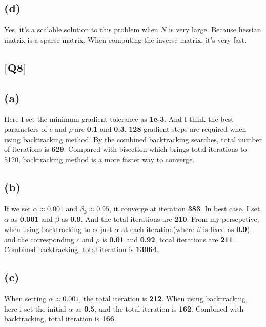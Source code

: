 \documentclass[12pt, a4 paper]{article}
\begin{document}
\begin{framed}
        \subsection{(d)}
        Yes, it's a scalable solution to this problem when $N$ is very large. Because hessian matrix is a sparse matrix. When computing the inverse matrix, it's very fast.
    \end{framed}

    \begin{framed}
        \section{[Q8]}
        \subsection{(a)}
        Here I set the minimum gradient tolerance as \textbf{1e-3}. And I think the best parameters
         of $c$ and $\rho$ are \textbf{0.1} and \textbf{0.3}. \textbf{128} 
         gradient steps are required when using backtracking method. By the combined
          backtracking searches, total number of iterations is \textbf{629}. Compared 
          with bisection which brings total iterations to 5120, backtracking 
          method is a more faster way to converge.

        \subsection{(b)}
        If we set $\alpha \approx 0.001$ and $\beta_{k} \approx 0.95$, it converge at iteration
        \textbf{383}. In best case, I set $\alpha$ as \textbf{0.001} and $\beta$ as \textbf{0.9}. 
        And the total iterations are \textbf{210}. From my persepctive, when using backtracking 
        to adjust $\alpha$ at each iteration(where $\beta$ is fixed as \textbf{0.9}),  and the 
        corresponding $c$ and $\rho$ is \textbf{0.01} and \textbf{0.92}, total 
        iterations are \textbf{211}. Combined backtracking, total iteration is \textbf{13064}.

        \subsection{(c)}
        When setting $\alpha \approx 0.001$, the total iteration is \textbf{212}. When using
         backtracking, here i set the initial $\alpha$ as \textbf{0.5}, and the total 
         iteration is \textbf{162}. Combined with backtracking, total iteration is
         \textbf{166}.


\end{framed}
\end{document}
